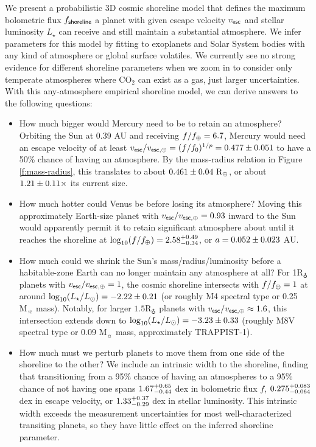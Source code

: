 \documentclass[modern,linenumbers,trackchanges]{aastex7}
\begin{document}
We present a probabilistic 3D cosmic shoreline model that defines the maximum bolometric flux $f_{\sf shoreline}$ a planet with given escape velocity $v_{\sf esc}$ and stellar luminosity $L_\star$ can receive and still maintain a substantial atmosphere. We infer parameters for this model by fitting to exoplanets and Solar System bodies with any kind of atmosphere or global surface volatiles. We currently see no strong evidence for different shoreline parameters when we zoom in to consider only temperate atmospheres where CO$_2$ can exist as a gas, just larger uncertainties. With this any-atmosphere empirical shoreline model, we can derive answers to the following questions:
\begin{itemize}
\item How much bigger would Mercury need to be to retain an atmosphere? Orbiting the Sun at 0.39 AU and receiving $f/f_\oplus = 6.7$, Mercury would need an escape velocity of at least $v_{\sf esc}/v_{\sf esc, \oplus} = (f/f_{\sf 0})^{1/p} = 0.477 \pm 0.051$ to have a 50\% chance of having an atmosphere. By the mass-radius relation in Figure \ref{f:mass-radius}, this translates to about $0.461 \pm 0.04~ \mathrm{R_\oplus}$, or about $1.21 \pm 0.11 \times$ its current size. 

\item How much hotter could Venus be before losing its atmosphere? Moving this approximately Earth-size planet with $v_{\sf esc}/v_{\sf esc, \oplus} = 0.93$ inward to the Sun would apparently permit it to retain significant atmosphere about until it reaches the shoreline at $\log_{10} (f/f_{\oplus}) = 2.58_{-0.34}^{+0.49}$, or $a = 0.052 \pm 0.023$ AU.

\item How much could we shrink the Sun's mass/radius/luminosity before a habitable-zone Earth can no longer maintain any atmosphere at all? For 1$\mathrm{R_\earth}$ planets with $v_{\sf esc}/v_{\sf esc, \oplus} = 1$, the cosmic shoreline intersects with $f/f_\oplus =1 $ at around $\log_{10}(L_\star/L_\odot) = -2.22 \pm 0.21$ (or roughly M4 spectral type or 0.25 $\mathrm{M_\sun}$ mass). Notably, for larger $1.5 \mathrm{R_\earth}$ planets with $v_{\sf esc}/v_{\sf esc, \oplus} \approx 1.6$, this intersection extends down to $\log_{10}(L_\star/L_\odot) = -3.23 \pm 0.33$ (roughly M8V spectral type or 0.09 $\mathrm{M_\sun}$ mass, approximately TRAPPIST-1).

\item How much must we perturb planets to move them from one side of the shoreline to the other? We include an intrinsic width to the shoreline, finding that transitioning from a 95\% chance of having an atmospheres to a 95\% chance of not having one spans  $1.67_{-0.44}^{+0.65}$ dex in bolometric flux $f$, $0.275_{-0.064}^{+0.083}$ dex in escape velocity, or $1.33_{-0.29}^{+0.37}$ dex in stellar luminosity. This intrinsic width exceeds the measurement uncertainties for most well-characterized transiting planets, so they have little effect on the inferred shoreline parameter.



\end{itemize}
\end{document}
